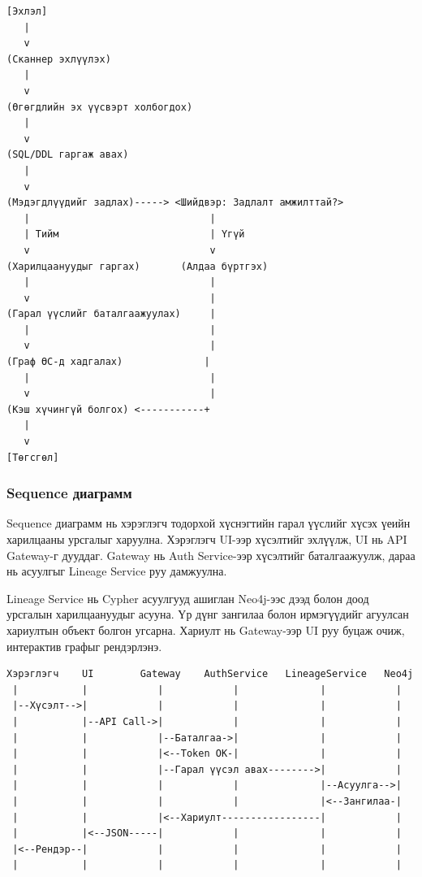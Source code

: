 \begin{verbatim}
[Эхлэл]
   |
   v
(Сканнер эхлүүлэх)
   |
   v
(Өгөгдлийн эх үүсвэрт холбогдох)
   |
   v
(SQL/DDL гаргаж авах)
   |
   v
(Мэдэгдлүүдийг задлах)-----> <Шийдвэр: Задлалт амжилттай?>
   |                               |
   | Тийм                          | Үгүй
   v                               v
(Харилцаануудыг гаргах)       (Алдаа бүртгэх)
   |                               |
   v                               |
(Гарал үүслийг баталгаажуулах)     |
   |                               |
   v                               |
(Граф ӨС-д хадгалах)              |
   |                               |
   v                               |
(Кэш хүчингүй болгох) <-----------+
   |
   v
[Төгсгөл]
\end{verbatim}

\subsubsection{Sequence диаграмм}

Sequence диаграмм нь хэрэглэгч тодорхой хүснэгтийн гарал үүслийг хүсэх үеийн харилцааны урсгалыг харуулна. Хэрэглэгч UI-ээр хүсэлтийг эхлүүлж, UI нь API Gateway-г дууддаг. Gateway нь Auth Service-ээр хүсэлтийг баталгаажуулж, дараа нь асуулгыг Lineage Service руу дамжуулна.

Lineage Service нь Cypher асуулгууд ашиглан Neo4j-ээс дээд болон доод урсгалын харилцаануудыг асууна. Үр дүнг зангилаа болон ирмэгүүдийг агуулсан хариултын объект болгон угсарна. Хариулт нь Gateway-ээр UI руу буцаж очиж, интерактив графыг рендэрлэнэ.

\begin{verbatim}
Хэрэглэгч    UI        Gateway    AuthService   LineageService   Neo4j
 |           |            |            |              |            |
 |--Хүсэлт-->|            |            |              |            |
 |           |--API Call->|            |              |            |
 |           |            |--Баталгаа->|              |            |
 |           |            |<--Token OK-|              |            |
 |           |            |--Гарал үүсэл авах-------->|            |
 |           |            |            |              |--Асуулга-->|
 |           |            |            |              |<--Зангилаа-|
 |           |            |<--Хариулт-----------------|            |
 |           |<--JSON-----|            |              |            |
 |<--Рендэр--|            |            |              |            |
 |           |            |            |              |            |
\end{verbatim}

